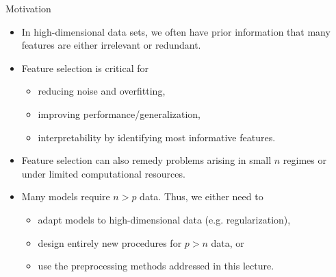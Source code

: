 \documentclass[11pt,compress,t,notes=noshow, xcolor=table]{beamer}
\begin{document}
\begin{vbframe}{Motivation}
    \begin{itemize}
    \setlength{\itemsep}{1.0em}
      \item In high-dimensional data sets, we often have prior information that many features are either irrelevant or redundant.
      \item Feature selection is critical for 
    \begin{itemize}
        \item reducing noise and overfitting, 
        \item improving performance/generalization,
        \item interpretability by identifying most informative features.
    \end{itemize}
      \item Feature selection can also remedy problems arising in small $n$ regimes or under limited computational resources. 
      \item Many models require $n > p$ data. Thus, we either need to
      \begin{itemize}
        \item adapt models to high-dimensional data (e.g. regularization),
        \item design entirely new procedures for $p>n$ data, or
        \item use the preprocessing methods addressed in this lecture.
      \end{itemize}
    \end{itemize}
  \end{vbframe}
\end{document}
